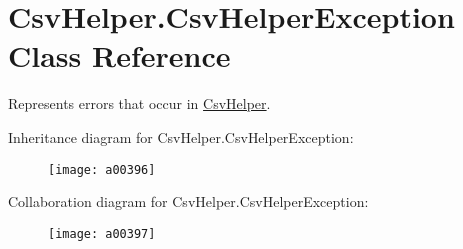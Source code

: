\hypertarget{a00063}{\section{Csv\-Helper.\-Csv\-Helper\-Exception Class Reference}
\label{a00063}
}


Represents errors that occur in \hyperlink{a00311}{Csv\-Helper}.  




Inheritance diagram for Csv\-Helper.\-Csv\-Helper\-Exception\-:
\nopagebreak
\begin{figure}[H]
\begin{center}
\leavevmode
\texttt{[image: a00396]}
\end{center}
\end{figure}


Collaboration diagram for Csv\-Helper.\-Csv\-Helper\-Exception\-:
\nopagebreak
\begin{figure}[H]
\begin{center}
\leavevmode
\texttt{[image: a00397]}
\end{center}
\end{figure}
